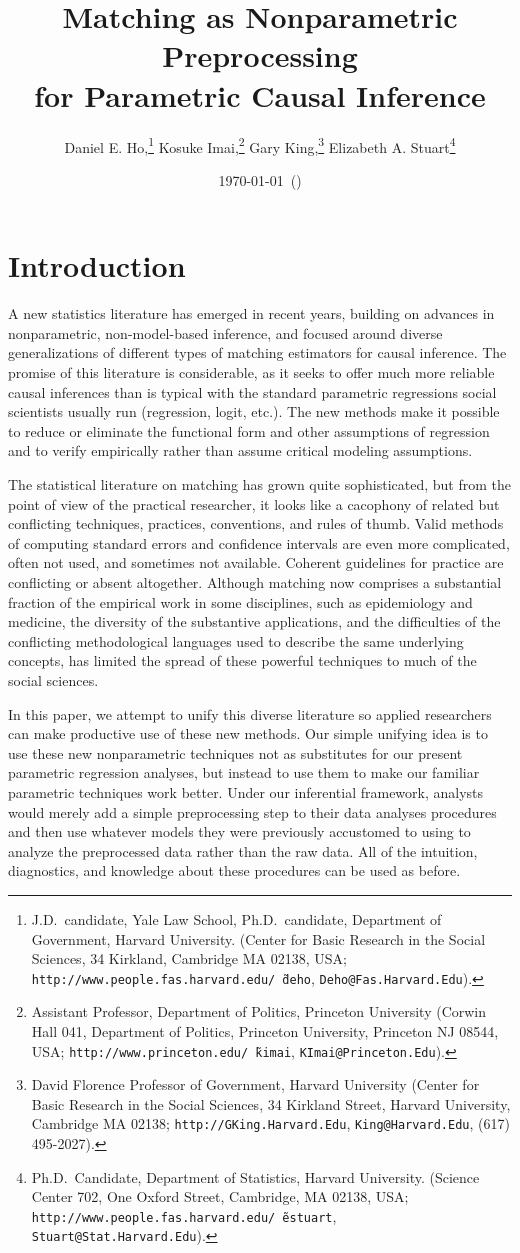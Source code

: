 \documentclass[11pt,titlepage]{article}
\title{Matching as Nonparametric Preprocessing\\
for Parametric Causal Inference}
\author{Daniel E. Ho,\thanks{J.D.\ candidate, Yale Law School, Ph.D.\
    candidate, Department of Government, Harvard
    University. (Center for Basic Research in the Social Sciences, 34
    Kirkland, Cambridge MA 02138, USA;
    \texttt{http://www.people.fas.harvard.edu/\~\,deho},
    \texttt{Deho@Fas.Harvard.Edu}).}
Kosuke Imai,\thanks{Assistant Professor, Department of Politics, Princeton
    University (Corwin Hall 041, Department of Politics, Princeton
    University, Princeton NJ 08544, USA;
    \texttt{http://www.princeton.edu/\~\,kimai},
    \texttt{KImai@Princeton.Edu}).}
Gary King,\thanks{David Florence Professor of Government, Harvard
  University (Center for Basic Research in the Social Sciences, 34
  Kirkland Street, Harvard University, Cambridge MA 02138;
  \texttt{http://GKing.Harvard.Edu}, \texttt{King@Harvard.Edu}, (617)
  495-2027).}
Elizabeth A. Stuart\thanks{Ph.D.\ Candidate, Department of Statistics, Harvard
  University. (Science Center 702, One Oxford Street, Cambridge, MA
  02138, USA;
  \texttt{http://www.people.fas.harvard.edu/\~\,estuart},
  \texttt{Stuart@Stat.Harvard.Edu}).}}
\date{\today\ (\printtime)}
\begin{document}
\maketitle

\begin{abstract}

\end{abstract}

\section{Introduction}

A new statistics literature has emerged in recent years, building on
advances in nonparametric, non-model-based inference, and focused
around diverse generalizations of different types of matching
estimators for causal inference.  The promise of this literature is
considerable, as it seeks to offer much more reliable causal
inferences than is typical with the standard parametric regressions
social scientists usually run (regression, logit, etc.).  The new
methods make it possible to reduce or eliminate the functional form
and other assumptions of regression and to verify empirically rather
than assume critical modeling assumptions.

The statistical literature on matching has grown quite sophisticated,
but from the point of view of the practical researcher, it looks like
a cacophony of related but conflicting techniques, practices,
conventions, and rules of thumb.  Valid methods of computing standard
errors and confidence intervals are even more complicated, often not
used, and sometimes not available.  Coherent guidelines for practice
are conflicting or absent altogether.  Although matching now comprises
a substantial fraction of the empirical work in some disciplines, such
as epidemiology and medicine, the diversity of the substantive
applications, and the difficulties of the conflicting methodological
languages used to describe the same underlying concepts, has limited
the spread of these powerful techniques to much of the social
sciences.

In this paper, we attempt to unify this diverse literature so applied
researchers can make productive use of these new methods.  Our simple
unifying idea is to use these new nonparametric techniques not as
substitutes for our present parametric regression analyses, but
instead to use them to make our familiar parametric techniques work
better.  Under our inferential framework, analysts would merely add a
simple preprocessing step to their data analyses procedures and then
use whatever models they were previously accustomed to using to
analyze the preprocessed data rather than the raw data.  All of the
intuition, diagnostics, and knowledge about these procedures can be
used as before.  
\end{document}
